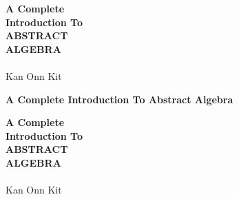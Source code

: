 {\begin{titlepage}
        \begin{center}
            \color{white}

            {\fontsize{20pt}{0pt}\selectfont \textbf{A Complete}\\\textbf{Introduction To}}\\

            \vspace{0.4cm}
            {\fontsize{48pt}{0pt}\selectfont \textbf{ABSTRACT}}\\
            \vspace{0.15cm}
            {\fontsize{48pt}{0pt}\selectfont \textbf{ALGEBRA}}\\

            \vspace{0.5cm}
            {\fontsize{14pt}{0pt}\selectfont \editiontext}\\

            \vspace{1.25cm}
            {\fontsize{20pt}{0pt}\selectfont Kan Onn Kit}\\
        \end{center}
        \vspace*{\fill}
    \end{titlepage}
}{
    \thispagestyle{empty}
    \null\vspace{4cm}
    \begin{raggedleft}
        {\fontsize{24pt}{0pt}\selectfont \textbf{A Complete Introduction To Abstract Algebra}}\\
    \end{raggedleft}

    \begin{titlepage}
        \null\vspace{4cm}
        \begin{raggedleft}
            {\fontsize{20pt}{0pt}\selectfont \textbf{A Complete}\\\textbf{Introduction To}}\\

            \vspace{0.4cm}
            {\fontsize{48pt}{0pt}\selectfont \textbf{ABSTRACT}}\\
            \vspace{0.15cm}
            {\fontsize{48pt}{0pt}\selectfont \textbf{ALGEBRA}}\\

            \vspace{0.5cm}
            {\fontsize{16pt}{0pt}\selectfont \editiontext}\\

            \vspace{1.25cm}
            {\fontsize{20pt}{0pt}\selectfont Kan Onn Kit}\\
        \end{raggedleft}
        \vspace*{\fill}
    \end{titlepage}
}

